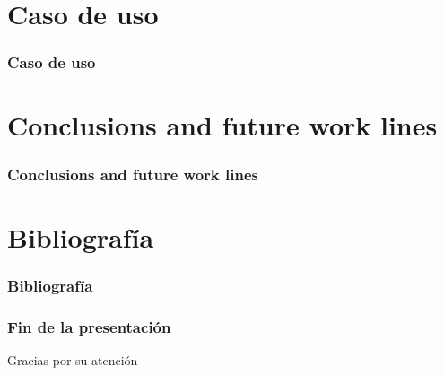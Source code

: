 \documentclass{beamer}
\begin{document}
\section{Caso de uso}

\begin{frame}[allowframebreaks]
\frametitle{Caso de uso}

\end{frame}


\section{Conclusions and future work lines}
\begin{frame}[allowframebreaks]
  \frametitle{Conclusions and future work lines}

\end{frame}


\section{Bibliografía}
\begin{frame}[allowframebreaks]
  \frametitle{Bibliografía}
  
  
  \nocite{*}
\end{frame}

\begin{frame}
  \frametitle{Fin de la presentación}
  \begin{center}
    \Huge{Gracias por su atención}
  \end{center}
\end{frame}
\end{document}
